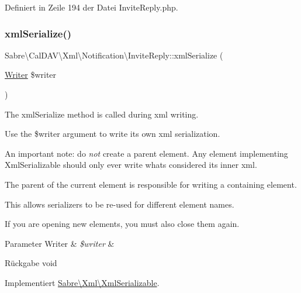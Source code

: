 Definiert in Zeile 194 der Datei Invite\+Reply.\+php.

\mbox{\label{class_sabre_1_1_cal_d_a_v_1_1_xml_1_1_notification_1_1_invite_reply_a652400645af9418719cf085364eb4ace}} 
\subsubsection{\texorpdfstring{xml\+Serialize()}{xmlSerialize()}}
{\footnotesize\ttfamily Sabre\textbackslash{}\+Cal\+D\+A\+V\textbackslash{}\+Xml\textbackslash{}\+Notification\textbackslash{}\+Invite\+Reply\+::xml\+Serialize (\begin{DoxyParamCaption}\item[{\mbox{\hyperlink{class_sabre_1_1_xml_1_1_writer}{Writer}}}]{\$writer }\end{DoxyParamCaption})}

The xml\+Serialize method is called during xml writing.

Use the \$writer argument to write its own xml serialization.

An important note\+: do {\itshape not} create a parent element. Any element implementing Xml\+Serializable should only ever write what\textquotesingle{}s considered its \textquotesingle{}inner xml\textquotesingle{}.

The parent of the current element is responsible for writing a containing element.

This allows serializers to be re-\/used for different element names.

If you are opening new elements, you must also close them again.


\begin{DoxyParams}[1]{Parameter}
Writer & {\em \$writer} & \\
\hline
\end{DoxyParams}
\begin{DoxyReturn}{Rückgabe}
void 
\end{DoxyReturn}


Implementiert \mbox{\hyperlink{interface_sabre_1_1_xml_1_1_xml_serializable_aa78f3ee43aa699be8347181653a53d8c}{Sabre\textbackslash{}\+Xml\textbackslash{}\+Xml\+Serializable}}.



